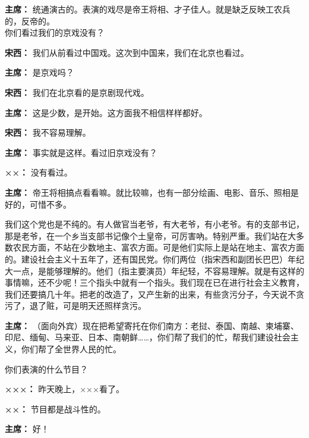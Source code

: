 \begin{duihua}
\item[\textbf{主席：}] 统通演古的。表演的戏尽是帝王将相、才子佳人。就是缺乏反映工农兵的，反帝的。\\
你们看过我们的京戏没有？

\item[\textbf{宋西：}] 我们从前看过中国戏。这次到中国来，我们在北京也看过。

\item[\textbf{主席：}] 是京戏吗？

\item[\textbf{宋西：}] 我们在北京看的是京剧现代戏。

\item[\textbf{主席：}] 这是少数，是开始。这方面我不相信样样都好。

\item[\textbf{宋西：}] 我不容易理解。

\item[\textbf{主席：}] 事实就是这样。看过旧京戏没有？

\item[\textbf{××：}] 没有看过。

\item[\textbf{主席：}] 帝王将相搞点看看嘛。就比较嘛，也有一部分绘画、电影、音乐、照相是好的，可惜不多。

我们这个党也是不纯的。有人做官当老爷，有大老爷，有小老爷。有的支部书记，那是老爷，在一个乡当支部书记像个土皇帝，可厉害吶。特别严重。我们站在大多数农民方面，不站在少数地主、富农方面。可是他们实际上是站在地主、富农方面的。建设社会主义十五年了，还有国民党。你们两位（指宋西和副团长巴巴）年纪大一点，是能够理解的。他们（指主要演员）年纪轻，不容易理解。就是有这样的事情嘛，还不少呢！三个指头中就有一个指头。我们现在已在进行社会主义教育，我们还要搞几十年。把老的改造了，又产生新的出来，有些贪污分子，今天说不贪污了，退了赃，可是明天还照样贪污。

\item[\textbf{主席：}] （面向外宾）现在把希望寄托在你们南方：老挝、泰国、南越、柬埔寨、印尼、缅甸、马来亚、日本、南朝鲜……，你们帮了我们的忙，帮我们建设社会主义，你们帮了全世界人民的忙。

你们表演的什么节目？

\item[\textbf{×××：}] 昨天晚上，×××看了。

\item[\textbf{××：}] 节目都是战斗性的。

\item[\textbf{主席：}] 好！


\end{duihua}
